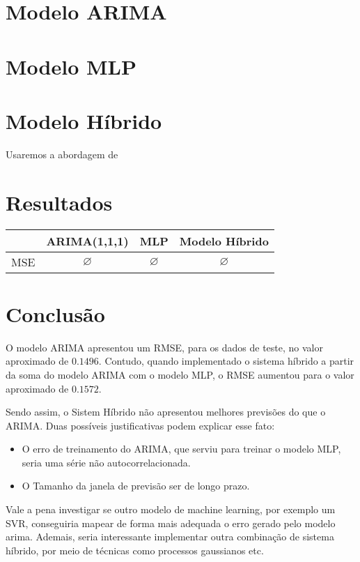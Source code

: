 \documentclass{article}
\begin{document}
\section{Modelo ARIMA}

\section{Modelo MLP}

\section{Modelo Híbrido}
Usaremos a abordagem de \cite{hybrid}

\section{Resultados}
\begin{center}
\begin{tabular}{ |c|c|c|c| }
\hline
\  &ARIMA(1,1,1) & MLP & Modelo Híbrido \\
\hline
MSE & $\varnothing$ & $\varnothing$ & $\varnothing$ \\
\hline
\end{tabular}
\end{center}

\section{Conclusão}
O modelo ARIMA apresentou um RMSE, para os dados de teste, no valor aproximado de $0.1496$. Contudo, quando implementado o sistema híbrido a partir da soma do modelo ARIMA com o modelo MLP, o RMSE aumentou para o valor aproximado de $0.1572$.

Sendo assim, o Sistem Híbrido não apresentou melhores previsões do que o ARIMA. Duas possíveis justificativas podem explicar esse fato:
\begin{itemize}
    \item O erro de treinamento do ARIMA, que serviu para treinar o modelo MLP, seria uma série não autocorrelacionada.
    \item O Tamanho da janela de previsão ser de longo prazo.
\end{itemize}
Vale a pena investigar se outro modelo de machine learning, por exemplo um SVR, conseguiria mapear de forma mais adequada o erro gerado pelo modelo arima. Ademais, seria interessante implementar outra combinação de sistema híbrido, por meio de técnicas como processos gaussianos etc.



\end{document}
